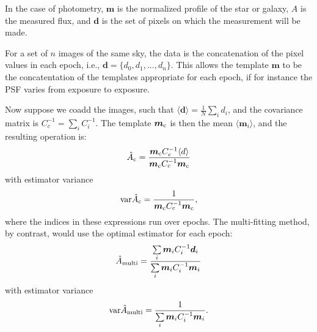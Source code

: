 \documentclass[a4paper,fleqn,usenatbib,referee]{mnras}
\begin{document}
In the case of photometry, $\boldsymbol{m}$ is the normalized profile of the
star or galaxy, $A$ is the measured flux, and $\boldsymbol{d}$ is the set of
pixels on which the measurement will be made.

For a set of $n$ images of the same sky, the data is the concatenation of the
pixel values in each epoch, i.e., $\boldsymbol{d} = \{d_0, d_1, ..., d_n \}$.
This allows the template $\boldsymbol{m}$ to be the concatentation of the
templates appropriate for each epoch, if for instance the PSF varies from
exposure to exposure.

Now suppose we coadd the images, such that $\langle \boldsymbol{d} \rangle = \frac{1}{N}\sum\limits_i
d_i$, and the covariance matrix is $C_c^{-1} = \sum\limits_i C_i^{-1}$.
The template $\boldsymbol{m}_{\rm c}$ is then the mean $\langle
\boldsymbol{m}_i\rangle$, and the resulting operation is:
\begin{align}
    \hat{A}_{\rm c} = \frac{\boldsymbol{m}_{\rm c} C_c^{-1} \langle d \rangle}{\boldsymbol{m}_{\rm c} C_c^{-1}\boldsymbol{m}_{\rm c}} 
\end{align}
with estimator variance
\begin{align} \label{eq:coaddvarest}
{\rm var}\hat{A}_{\rm c} = \frac{1}{\boldsymbol{m}_{\rm c} C_c^{-1}\boldsymbol{m}_{\rm c}},
\end{align}
where the indices in these expressions run over epochs. The multi-fitting
method, by contrast, would use the optimal estimator for each epoch:
\begin{align}
\hat{A}_{\rm multi} = \frac{\sum\limits_i \boldsymbol{m}_i C_i^{-1}\boldsymbol{d}_i}{\sum\limits_i \boldsymbol{m}_i C_i^{-1}\boldsymbol{m}_i}
\end{align}
with estimator variance
\begin{align}
{\rm var}\hat{A}_{\rm multi} = \frac{1}{\sum\limits_i \boldsymbol{m}_i C_i^{-1}\boldsymbol{m}_i}.
\end{align}
\end{document}
